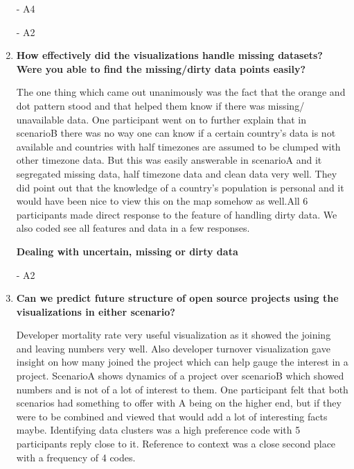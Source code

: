 \documentclass[seploa]{beavtex}
\begin{document}
\begin{enumerate}
{\em {}} - A4

{\em {}} - A2

\item \textbf{How effectively did the visualizations handle missing datasets? Were you able to find the missing/dirty data points easily?}

The one thing which came out unanimously was the fact that the orange and dot pattern stood and that helped them know if there was missing/ unavailable data. One participant went on to further explain that in scenarioB there was no way one can know if a certain country's data is not available and countries with half timezones are assumed to be clumped with other timezone data. But this was easily answerable in scenarioA and it segregated missing data, half timezone data and clean data very well. They did point out that the knowledge of a country's population is personal and it would have been nice to view this on the map somehow as well.All 6 participants made direct response to the feature of handling dirty data. We also coded see all features and data in a few responses.

\textbf{Dealing with uncertain, missing or dirty data}

{\em {}} - A2

\item \textbf{Can we predict future structure of open source projects using the visualizations in either scenario?}

Developer mortality rate very useful visualization as it showed the joining and leaving numbers very well. Also developer turnover visualization gave insight on how many joined the project which can help gauge the interest in a project. ScenarioA shows dynamics of a project over scenarioB which showed numbers and is not of a lot of interest to them. One participant felt that both scenarios had something to offer with A being on the higher end, but if they were to be combined and viewed that would add a lot of interesting facts maybe. Identifying data clusters was a high preference code with 5 participants reply close to it. Reference to context was a close second place with a frequency of 4 codes.


\end{enumerate}
\end{document}
